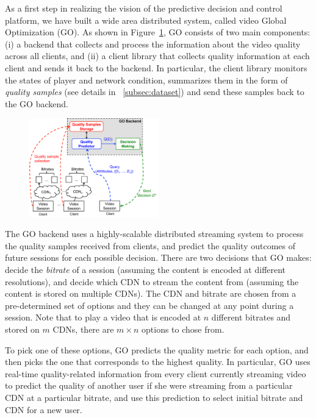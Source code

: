 As a first step in realizing the vision of the predictive decision and control 
platform, we have built a wide area distributed system, called video Global 
Optimization (GO). As shown in
Figure~\ref{fig:go-overview}, GO consists of two main components: (i)
a backend that collects and process the information about the video
quality across all clients, and (ii) a client library that collects
quality information at each client and sends it back to the backend. In
particular, the client library monitors the states of player and
network condition, summarizes them in the form of \emph{quality
  samples} (see details in \Section~\ref{subsec:dataset}) and send
these samples back to the GO backend.

\begin{figure}[h!]
\centering
 \includegraphics[width=0.5\textwidth] {figures/go-overview.pdf}
\label{fig:go-overview}
\end{figure}
 
The GO backend uses a highly-scalable distributed streaming system to
process the quality samples received from clients, and predict the
quality outcomes of future sessions for each possible decision. There
are two decisions that GO makes: decide the {\it bitrate} of a session
(assuming the content is encoded at different resolutions), and decide
which CDN to stream the content from (assuming the content is stored
on multiple CDNs). The CDN and bitrate are chosen from a
pre-determined set of options and they can be changed at any point
during a session. Note that to play a video that is encoded at $n$
different bitrates and stored on $m$ CDNs, there are $m\times n$
options to chose from.  

To pick one of these options, GO predicts the quality metric for each
option, and then picks the one that corresponds to the highest
quality. In particular, GO uses real-time quality-related information
from every client currently streaming video to predict the quality of
another user if she were streaming from a particular CDN at a
particular bitrate, and use this prediction to select initial bitrate
and CDN for a new user.

